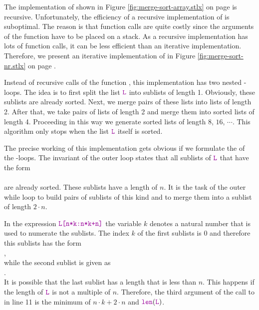 \noindent
The implementation of  shown in Figure \ref{fig:merge-sort-array.stlx} on page
\pageref{fig:merge-sort-array.stlx} is recursive.  Unfortunately, the efficiency of a recursive
implementation of  is suboptimal.  The reason is that function calls are quite
costly since the arguments of the function have to be placed on a stack.  As a recursive
implementation has lots of function calls, it can be less efficient than an iterative
implementation.  Therefore, we present an iterative implementation of  in Figure
\ref{fig:merge-sort-nr.stlx} on page \pageref{fig:merge-sort-nr.stlx}.

Instead of recursive calls of the function , this implementation has two nested 
-loops.  The idea is to first split the list $\mytt{L}$ into sublists of length 1.
Obviously, these sublists are already sorted.  Next, we merge pairs of these lists into lists of
length 2.  After that, we take pairs of lists of length 2 and merge them into sorted lists of length
4. Proceeding in this way we generate sorted lists of length
$8$, $16$, $\cdots$.  This algorithm only stops when the list $\mytt{L}$ itself is sorted.

The precise working of this implementation gets obvious if we formulate the  of the
-loops.  The invariant of the outer loop states that all sublists of $\mytt{L}$ 
that have the form
\\[0.2cm]
\hspace*{1.3cm}
\\[0.2cm]
are already sorted.  These sublists have a length of $n$.  It is the task of the outer while loop to build
pairs of sublists of this kind and to merge them into a sublist of length $2 \cdot n$.

In the expression $\mytt{L[n*k:n*k+n]}$ the variable $k$ denotes a natural
number that is used to numerate the sublists.  The index $k$ of the first sublists is $0$ and
therefore this sublists has the form
\\[0.2cm]
\hspace*{1.3cm}
,
\\[0.2cm]
while the second sublist is given as
\\[0.2cm]
\hspace*{1.3cm}
.
\\[0.2cm]
It is possible that the last sublist has a length that is less than $n$.  This happens if the length
of $\mytt{L}$ is not a multiple of $n$.  Therefore, the third argument of the call to 
in line 11 is the minimum of $n\cdot k + 2\cdot n$ and $\mytt{len}(\mytt{L})$.

